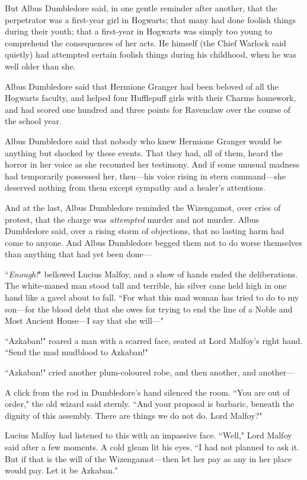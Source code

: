 But Albus Dumbledore said, in one gentle reminder after another, that the perpetrator was a first-year girl in Hogwarts; that many had done foolish things during their youth; that a first-year in Hogwarts was simply too young to comprehend the consequences of her acts. He himself (the Chief Warlock said quietly) had attempted certain foolish things during his childhood, when he was well older than she.

Albus Dumbledore said that Hermione Granger had been beloved of all the Hogwarts faculty, and helped four Hufflepuff girls with their Charms homework, and had scored one hundred and three points for Ravenclaw over the course of the school year.

Albus Dumbledore said that nobody who knew Hermione Granger would be anything but shocked by these events. That they had, all of them, heard the horror in her voice as she recounted her testimony. And if some unusual madness had temporarily possessed her, then—his voice rising in stern command—she deserved nothing from them except sympathy and a healer's attentions.

And at the last, Albus Dumbledore reminded the Wizengamot, over cries of protest, that the charge was \emph{attempted} murder and not murder. Albus Dumbledore said, over a rising storm of objections, that no lasting harm had come to anyone. And Albus Dumbledore begged them not to do worse themselves than anything that had yet been done—

``\emph{Enough!}" bellowed Lucius Malfoy, and a show of hands ended the deliberations. The white-maned man stood tall and terrible, his silver cane held high in one hand like a gavel about to fall. ``For what this mad woman has tried to do to my son—for the blood debt that she owes for trying to end the line of a Noble and Most Ancient House—I say that she will—"

``Azkaban!" roared a man with a scarred face, seated at Lord Malfoy's right hand. ``Send the mad mudblood to Azkaban!"

``Azkaban!" cried another plum-coloured robe, and then another, and another—

A click from the rod in Dumbledore's hand silenced the room. ``You are out of order," the old wizard said sternly. ``And your proposal is barbaric, beneath the dignity of this assembly. There are things we do not do. Lord Malfoy?"

Lucius Malfoy had listened to this with an impassive face. ``Well," Lord Malfoy said after a few moments. A cold gleam lit his eyes. ``I had not planned to ask it. But if that is the will of the Wizengamot—then let her pay as any in her place would pay. Let it be Azkaban."

